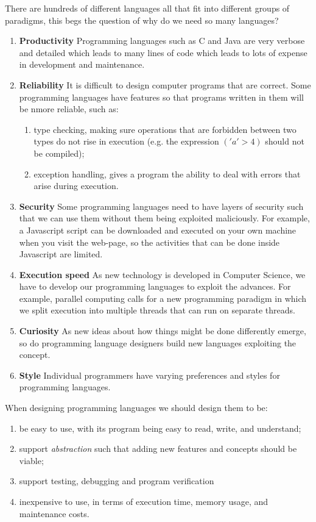 There are hundreds of different languages all that fit into different groups of paradigms, this begs the question of why do we need so many languages? 

\begin{enumerate}
    \item \textbf{Productivity} Programming languages such as C and Java are very verbose and detailed which leads to many lines of code which leads to lots of expense in development and maintenance. 
    \item \textbf{Reliability} It is difficult to design computer programs that are correct. Some programming languages have features so that programs written in them will be nmore reliable, such as:
    \begin{enumerate}
        \item type checking, making sure operations that are forbidden between two types do not rise in execution (e.g. the expression $('a'>4)$ should not be compiled);
        \item exception handling, gives a program the ability to deal with errors that arise during execution.
    \end{enumerate}
    \item \textbf{Security} Some programming languages need to have layers of security such that we can use them without them being exploited maliciously. For example, a Javascript script can be downloaded and executed on your own machine when you visit the web-page, so the activities that can be done inside Javascript are limited.
    \item \textbf{Execution speed} As new technology is developed in Computer Science, we have to develop our programming languages to exploit the advances. For example, parallel computing calls for a new programming paradigm in which we split execution into multiple threads that can run on separate threads.
    \item \textbf{Curiosity} As new ideas about how things might be done differently emerge, so do programming language designers build new languages exploiting the concept.
    \item \textbf{Style} Individual programmers have varying preferences and styles for programming languages.
\end{enumerate}

When designing programming languages we should design them to be:

\begin{enumerate}
    \item be easy to use, with its program being easy to read, write, and understand;
    \item support \emph{abstraction} such that adding new features and concepts should be viable;
    \item support testing, debugging and program verification 
    \item inexpensive to use, in terms of execution time, memory usage, and maintenance costs.
\end{enumerate}

